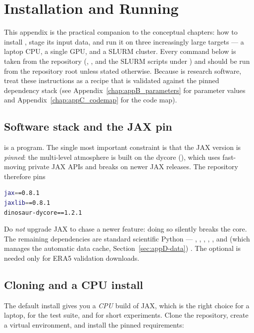 \chapter{Installation and Running}\label{chap:appD_running}

This appendix is the practical companion to the conceptual chapters: how to
install \model, stage its input data, and run it on three increasingly large
targets --- a laptop CPU, a single GPU, and a SLURM cluster. Every command below
is taken from the repository (, , and the
SLURM scripts under ) and should be run from the repository
root unless stated otherwise. Because \model{} is research software, treat these
instructions as a recipe that is validated against the pinned dependency stack
(see Appendix~\ref{chap:appB_parameters} for parameter values and
Appendix~\ref{chap:appC_codemap} for the code map).

\section{Software stack and the JAX pin}

\model{} is a \jax{} program. The single most important constraint is that the
JAX version is \emph{pinned}: the multi-level atmosphere is built on the
\dino{} dycore (), which uses fast-moving private
JAX APIs and breaks on newer JAX releases. The repository therefore pins

\begin{lstlisting}[language=bash]
jax==0.8.1
jaxlib==0.8.1
dinosaur-dycore==1.2.1
\end{lstlisting}

\noindent Do \emph{not} upgrade JAX to chase a newer feature: doing so silently
breaks the \dino{} core. The remaining dependencies are standard scientific
Python --- , , , ,
, and  (which manages the automatic data cache,
Section~\ref{sec:appD-data}) \citep{harris2020numpy,virtanen2020scipy,hoyer2017xarray,hunter2007matplotlib,uieda2020pooch,dinosaur_software}. The optional  is needed only for
ERA5 validation downloads.

\section{Cloning and a CPU install}

The default install gives you a \emph{CPU} build of JAX, which is the right
choice for a laptop, for the test suite, and for short experiments. Clone the
repository, create a virtual environment, and install the pinned requirements:

